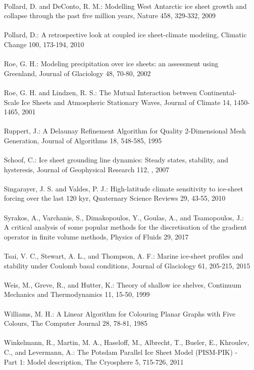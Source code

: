 \documentclass{article}
\begin{document}
\\
Pollard, D. and DeConto, R. M.: Modelling West Antarctic ice sheet growth and collapse through the past five million years, Nature 458, 329-332, 2009\\
\\
Pollard, D.: A retrospective look at coupled ice sheet-climate modeiing, Climatic Change 100, 173-194, 2010\\
\\
Roe, G. H.: Modeling precipitation over ice sheets: an assessment using Greenland, Journal of Glaciology 48, 70-80, 2002\\
\\
Roe, G. H. and Lindzen, R. S.: The Mutual Interaction between Continental-Scale Ice Sheets and Atmospheric Stationary Waves, Journal of Climate 14, 1450-1465, 2001\\
\\
Ruppert, J.: A Delaunay Refinement Algorithm for Quality 2-Dimensional Mesh Generation, Journal of Algorithms 18, 548-585, 1995\\
\\
Schoof, C.: Ice sheet grounding line dynamics: Steady states, stability, and hysteresis, Journal of Geophysical Research 112, , 2007\\
\\
Singarayer, J. S. and Valdes, P. J.: High-latitude climate sensitivity to ice-sheet forcing over the last 120 kyr, Quaternary Science Reviews 29, 43-55, 2010\\
\\
Syrakos, A., Varchanis, S., Dimakopoulos, Y., Goulas, A., and Tsamopoulos, J.: A critical analysis of some popular methods for the discretisation of the gradient operator in finite volume methods, Physics of Fluids 29, 2017\\
\\
Tsai, V. C., Stewart, A. L., and Thompson, A. F.: Marine ice-sheet profiles and stability under Coulomb basal conditions, Journal of Glaciology 61, 205-215, 2015\\
\\
Weis, M., Greve, R., and Hutter, K.: Theory of shallow ice shelves, Continuum Mechanics and Thermodynamics 11, 15-50, 1999\\
\\
Williams, M. H.: A Linear Algorithm for Colouring Planar Graphs with Five Colours, The Computer Journal 28, 78-81, 1985\\
\\
Winkelmann, R., Martin, M. A., Haseloff, M., Albrecht, T., Bueler, E., Khroulev, C., and Levermann, A.: The Potsdam Parallel Ice Sheet Model (PISM-PIK) - Part 1: Model description, The Cryosphere 5, 715-726, 2011\\
\\
\end{document}
